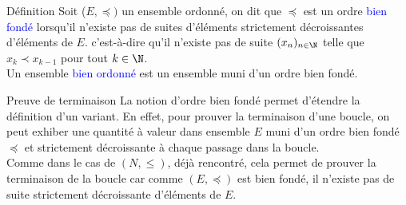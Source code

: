 \documentclass[10pt]{beamer}
\begin{document}
\begin{frame}[fragile]{\Ctitle}{\stitle}
	\begin{alertblock}{Définition}
		Soit ($E, \preccurlyeq)$ un ensemble ordonné, on dit que $\preccurlyeq$ est un ordre \textcolor{blue}{bien fondé} lorsqu'il n'existe pas de suites d'éléments strictement décroissantes d'éléments de $E$.
		c'est-à-dire qu'il n'existe pas de suite $(x_n)_{n \in \N}$ telle que $x_k \prec x_{k-1}$ pour tout $k \in \N$. \\
		Un ensemble \textcolor{blue}{bien ordonné} est un ensemble muni d'un ordre bien fondé.
	\end{alertblock}
\end{frame}


\begin{frame}[fragile]{\Ctitle}{\stitle}
	\begin{block}{Preuve de terminaison}
		La notion d'ordre bien fondé permet d'étendre la définition d'un variant. En effet, pour prouver la terminaison d'une boucle, on peut exhiber une quantité à valeur dans ensemble $E$ muni d'un ordre bien fondé $\preccurlyeq$ et strictement décroissante à chaque passage dans la boucle.\\
		\onslide<2-> Comme dans le cas de $(N, \leqslant)$, déjà rencontré, cela permet de prouver la terminaison de la boucle car comme $(E, \preccurlyeq)$ est bien fondé, il n'existe pas de suite strictement décroissante d'éléments de $E$.
	\end{block}
\end{frame}
\end{document}
